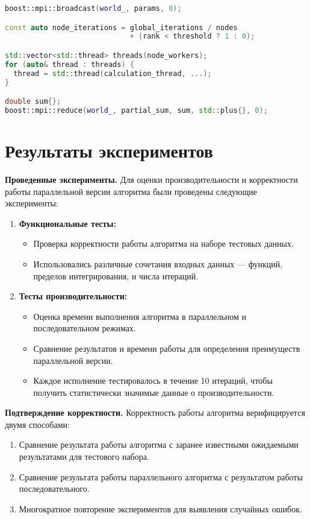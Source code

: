 \documentclass[a4paper,12pt]{article}
\begin{document}
\begin{lstlisting}[language=C++, caption=Основные моменты реализации с MPI+STL]
boost::mpi::broadcast(world_, params, 0);

const auto node_iterations = global_iterations / nodes
                             + (rank < threshold ? 1 : 0);

std::vector<std::thread> threads(node_workers);
for (auto& thread : threads) {
  thread = std::thread(calculation_thread, ...);
}

double sum{};
boost::mpi::reduce(world_, partial_sum, sum, std::plus{}, 0);
\end{lstlisting}

\section{Результаты экспериментов}
\textbf{Проведенные эксперименты.}
Для оценки производительности и корректности работы параллельной версии алгоритма были проведены следующие эксперименты:

\begin{enumerate}
\item\textbf{Функциональные тесты:}
\begin{itemize}
\item Проверка корректности работы алгоритма на наборе тестовых данных. 
\item Использовались различные сочетания входных данных — функций, пределов интегрирования, и числа итераций.

\end{itemize}

\item\textbf{Тесты производительности:}
\begin{itemize}
\item Оценка времени выполнения алгоритма в параллельном и последовательном режимах.
\item Сравнение результатов и времени работы для определения преимуществ параллельной версии.
\item Каждое исполнение тестировалось в течение 10 итераций, чтобы получить статистически значимые данные о производительности.
\end{itemize}
\end{enumerate}

\textbf{Подтверждение корректности.}
Корректность работы алгоритма верифицируется двумя способами:
\begin{enumerate}
\item Сравнение результата работы алгоритма с заранее известными ожидаемыми результатами для тестового набора.
\item Сравнение результата работы параллельного алгоритма с результатом работы последовательного.
\item Многократное повторение экспериментов для выявления случайных ошибок.
\end{enumerate}
\end{document}

